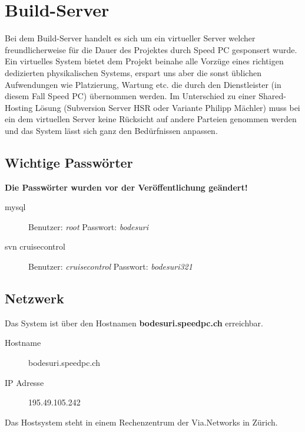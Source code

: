\documentclass[12pt,halfparskip]{scrreprt}
\begin{document}


\chapter{Build-Server} %
\label{cha:build_server}

Bei dem Build-Server handelt es sich um ein virtueller Server welcher freundlicherweise für die Dauer des Projektes durch Speed PC gesponsert wurde. Ein virtuelles System bietet dem Projekt beinahe alle Vorzüge eines richtigen dedizierten physikalischen Systems, erspart uns aber die sonst üblichen Aufwendungen wie Platzierung, Wartung etc. die durch den Dienstleister (in diesem Fall Speed PC) übernommen werden. Im Unterschied zu einer Shared-Hosting Lösung (Subversion Server HSR oder Variante Philipp Mächler) muss bei ein dem virtuellen Server keine Rücksicht auf andere Parteien genommen werden und das System lässt sich ganz den Bedürfnissen anpassen.


\section{Wichtige Passwörter} %
\label{sec:wichtige_passwoerter}

\textbf{Die Passwörter wurden vor der Veröffentlichung geändert!}

\begin{description}
  \item[mysql] Benutzer: \emph{root} Passwort: \emph{bodesuri}
  \item[svn cruisecontrol] Benutzer: \emph{cruisecontrol} Passwort: \emph{bodesuri321}
\end{description}


\section{Netzwerk} %
\label{sec:netzwerk}

Das System ist über den Hostnamen \textbf{bodesuri.speedpc.ch} erreichbar. 

\begin{description}
  \item[Hostname] bodesuri.speedpc.ch
  \item[IP Adresse] 195.49.105.242
\end{description}

Das Hostsystem steht in einem Rechenzentrum der Via.Networks in Zürich.
\end{document}
